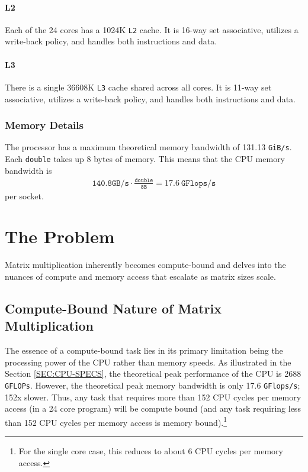 \documentclass{article}
\begin{document}
\paragraph{L2}
Each of the 24 cores has a 1024K \texttt{L2} cache. It is 16-way set associative, utilizes a write-back policy, and handles both instructions and data.

\paragraph{L3}
There is a single 36608K \texttt{L3} cache shared across all cores. It is 11-way set associative, utilizes a write-back policy, and handles both instructions and data.

\subsubsection*{Memory Details}
The processor has a maximum theoretical memory bandwidth of 131.13 \texttt{GiB/s}. 
Each \texttt{double} takes up 8 bytes of memory. This means that the CPU memory bandwidth is 
\begin{align*}
    \texttt{140.8GB/s} \cdot \frac{\texttt{double}}{\texttt{8B}} = 17.6\ \texttt{GFlops/s}
\end{align*}
per socket. 

\section{The Problem}

Matrix multiplication inherently becomes compute-bound and delves into the 
nuances of compute and memory access that escalate as matrix sizes scale.

\subsection{Compute-Bound Nature of Matrix Multiplication}

The essence of a compute-bound task lies in its primary limitation being the 
processing power of the CPU rather than memory speeds. As illustrated in the Section \ref{SEC:CPU-SPECS}, the theoretical peak performance of the CPU is
2688 \texttt{GFLOPs}. However, the theoretical peak memory bandwidth is only 17.6 \texttt{GFlops/s};
152x slower. Thus, any task that requires more than 152 CPU cycles per memory access (in a 24 core program) will be
compute bound (and any task requiring less than 152 CPU cycles per memory access is memory bound).\footnote{
    For the single core case, this reduces to about 6 CPU cycles per memory access.
}
\end{document}
